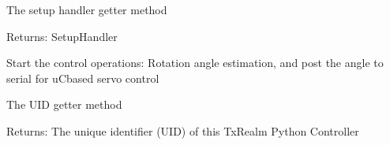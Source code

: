 \documentclass[letterpaper,10pt,english]{sphinxmanual}
\begin{document}
\begin{fulllineitems}
\begin{fulllineitems}
\label{\detokenize{TxRealm:TxRealm.TxController.setup_handler}}
\sphinxAtStartPar
The setup handler getter method

\sphinxAtStartPar
Returns: SetupHandler

\end{fulllineitems}


\begin{fulllineitems}
\label{\detokenize{TxRealm:TxRealm.TxController.start}}
\sphinxAtStartPar
Start the control operations: Rotation angle estimation, and post the angle to serial for uC\sphinxhyphen{}based servo control

\end{fulllineitems}


\begin{fulllineitems}
\label{\detokenize{TxRealm:TxRealm.TxController.uid}}
\sphinxAtStartPar
The UID getter method

\sphinxAtStartPar
Returns: The unique identifier (UID) of this TxRealm Python Controller

\end{fulllineitems}


\end{fulllineitems}

\end{document}

